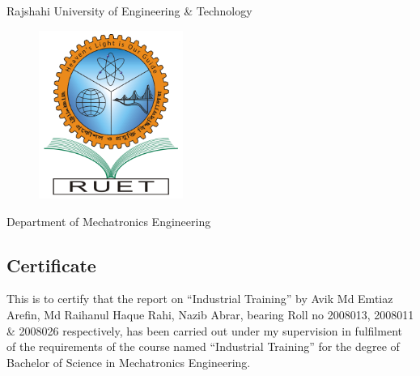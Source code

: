 \begin{center}
    Rajshahi University of Engineering \& Technology
\end{center}
\begin{figure}[h!]
    \centering
    \includegraphics[width=4.7cm]{figs/RUET.png}
    \label{fig:ruet2}
\end{figure}
\begin{center}
    Department of Mechatronics Engineering
    \subsection*{Certificate}
\end{center}
\noindent This is to certify that the report on “Industrial Training” by Avik Md Emtiaz Arefin, Md Raihanul Haque Rahi, Nazib Abrar, bearing Roll no 2008013, 2008011 \& 2008026 respectively, has been carried out under my supervision in fulfilment of the requirements of the course named “Industrial Training” for the degree of Bachelor of Science in Mechatronics Engineering.

